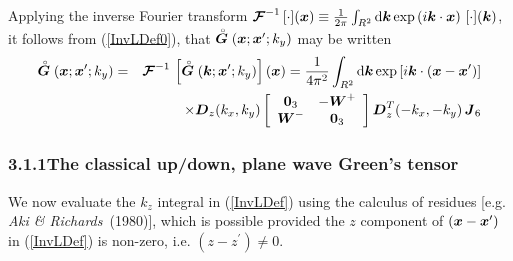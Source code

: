 \documentclass[11pt]{article}
\newcommand{\CB}[1]{\mbox{\boldmath$\cal #1$\unboldmath}}
\newcommand{\bmi}[1]{\mbox{\boldmath$\mit #1$\unboldmath}}
\newcommand{\rf}[1]{\stackrel{\scriptscriptstyle _{\,\,\circ}}{ #1}}
\begin{document}
Applying the inverse Fourier transform
${\CB F}^{-1}\, [\cdot]({\bmi x}) \equiv \frac{1}{{2 \pi}}
\int_{R^2 } {\rm d}{\bmi k} \exp \left(i {\bmi k}\cdot {\bmi x}\right)\,
[\cdot] ({\bmi k})$,
it follows from (\ref{InvLDef0}),
that $\rf{\bmi  G}({\bmi x};{\bmi x}^{\prime};k_y)$
may be written
\begin{eqnarray} \label{InvLDef}
\rf{\bmi  G}({\bmi x};{\bmi x}^{\prime};k_y)&=&{\CB F}^{-1}\, \left[\rf{\bmi  G}({\bmi
k};{\bmi x}^{\prime};k_y) \right]({\bmi x}) =\frac{1}{4 \pi^2}
\int_{R^2 } {\rm d}{\bmi k} \exp \left[i {\bmi k}\cdot ({\bmi x}-{\bmi
x}^{\prime})\right]\nonumber\\
&&\times {\bmi  D}_{z}({k}_{x},{k}_{y})
\left[{\begin{array}{cc}{\bf 0}_{3}&-{\bmi W}^{+}\\
{\bmi W}^{-}&{\bf 0}_{3}\end{array}}\right]{\bmi  D}_{z}^{T}(-{k}_{x},-{k}_{y})
\,{\bmi  J}_6
\end{eqnarray}

\subsubsection*{3.1.1\quad The classical up/down, plane wave Green's tensor}
We now evaluate the $k_{z}$ integral in (\ref{InvLDef}) using the calculus of
residues [e.g. {\em Aki \& Richards\/}~(1980)], which is possible provided
the $z$ component of  $({\bmi x}-{\bmi x}^{\prime})$ in  (\ref{InvLDef})
is non-zero, i.e. $({z}-{z}^{\prime})\not=0 $.
\end{document}

